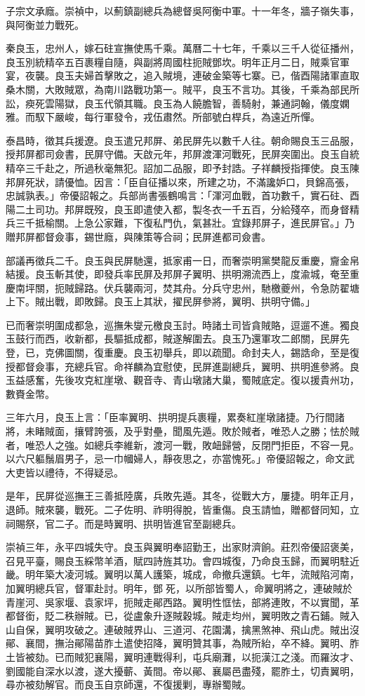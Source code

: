 \begin{pinyinscope}
子宗文承廕。崇禎中，以薊鎮副總兵為總督吳阿衡中軍。十一年冬，牆子嶺失事，與阿衡並力戰死。

秦良玉，忠州人，嫁石砫宣撫使馬千乘。萬曆二十七年，千乘以三千人從征播州，良玉別統精卒五百裹糧自隨，與副將周國柱扼賊鄧坎。明年正月二日，賊乘官軍宴，夜襲。良玉夫婦首擊敗之，追入賊境，連破金築等七寨。已，偕酉陽諸軍直取桑木關，大敗賊眾，為南川路戰功第一。賊平，良玉不言功。其後，千乘為部民所訟，瘐死雲陽獄，良玉代領其職。良玉為人饒膽智，善騎射，兼通詞翰，儀度嫻雅。而馭下嚴峻，每行軍發令，戎伍肅然。所部號白桿兵，為遠近所憚。

泰昌時，徵其兵援遼。良玉遣兄邦屏、弟民屏先以數千人往。朝命賜良玉三品服，授邦屏都司僉書，民屏守備。天啟元年，邦屏渡渾河戰死，民屏突圍出。良玉自統精卒三千赴之，所過秋毫無犯。詔加二品服，即予封誥。子祥麟授指揮使。良玉陳邦屏死狀，請優恤。因言：「臣自征播以來，所建之功，不滿讒妒口，貝錦高張，忠誠孰表。」帝優詔報之。兵部尚書張鶴鳴言：「渾河血戰，首功數千，實石砫、酉陽二土司功。邦屏既歿，良玉即遣使入都，製冬衣一千五百，分給殘卒，而身督精兵三千抵榆關。上急公家難，下復私門仇，氣甚壯。宜錄邦屏子，進民屏官。」乃贈邦屏都督僉事，錫世廕，與陳策等合祠；民屏進都司僉書。

部議再徵兵二千。良玉與民屏馳還，抵家甫一日，而奢崇明黨樊龍反重慶，齎金帛結援。良玉斬其使，即發兵率民屏及邦屏子翼明、拱明溯流西上，度渝城，奄至重慶南坪關，扼賊歸路。伏兵襲兩河，焚其舟。分兵守忠州，馳檄夔州，令急防翟塘上下。賊出戰，即敗歸。良玉上其狀，擢民屏參將，翼明、拱明守備。」

已而奢崇明圍成都急，巡撫朱燮元檄良玉討。時諸土司皆貪賊賂，逗遛不進。獨良玉鼓行而西，收新都，長驅抵成都，賊遂解圍去。良玉乃還軍攻二郎關，民屏先登，已，克佛圖關，復重慶。良玉初舉兵，即以疏聞。命封夫人，錫誥命，至是復授都督僉事，充總兵官。命祥麟為宜慰使，民屏進副總兵，翼明、拱明進參將。良玉益感奮，先後攻克紅崖墩、觀音寺、青山墩諸大巢，蜀賊底定。復以援貴州功，數賚金幣。

三年六月，良玉上言：「臣率翼明、拱明提兵裹糧，累奏紅崖墩諸捷。乃行間諸將，未睹賊面，攘臂誇張，及乎對壘，聞風先遁。敗於賊者，唯恐人之勝；怯於賊者，唯恐人之強。如總兵李維新，渡河一戰，敗衄歸營，反閉門拒臣，不容一見。以六尺軀鬚眉男子，忌一巾幗婦人，靜夜思之，亦當愧死。」帝優詔報之，命文武大吏皆以禮待，不得疑忌。

是年，民屏從巡撫王三善抵陸廣，兵敗先遁。其冬，從戰大方，屢捷。明年正月，退師。賊來襲，戰死。二子佐明、祚明得脫，皆重傷。良玉請恤，贈都督同知，立祠賜祭，官二子。而是時翼明、拱明皆進官至副總兵。

崇禎三年，永平四城失守。良玉與翼明奉詔勤王，出家財濟餉。莊烈帝優詔褒美，召見平臺，賜良玉綵幣羊酒，賦四詩旌其功。會四城復，乃命良玉歸，而翼明駐近畿。明年築大凌河城。翼明以萬人護築，城成，命撤兵還鎮。七年，流賊陷河南，加翼明總兵官，督軍赴討。明年，鄧死，以所部皆蜀人，命翼明將之，連破賊於青崖河、吳家堰、袁家坪，扼賊走鄖西路。翼明性恇怯，部將連敗，不以實聞，革都督銜，貶二秩辦賊。已，從盧象升逐賊穀城。賊走均州，翼明敗之青石鋪。賊入山自保，翼明攻破之。連破賊界山、三道河、花園溝，擒黑煞神、飛山虎。賊出沒鄖、襄間，撫治鄖陽苗胙土遣使招降，翼明贊其事，為賊所紿，卒不絳。翼明、胙土皆被劾。已而賊犯襄陽，翼明連戰得利，屯兵廟灘，以扼漢江之淺。而羅汝才、劉國能自深水以渡，遂大擾蘄、黃間。帝以鄖、襄屬邑盡殘，罷胙土，切責翼明，尋亦被劾解官。而良玉自京師還，不復援剿，專辦蜀賊。


\end{pinyinscope}
